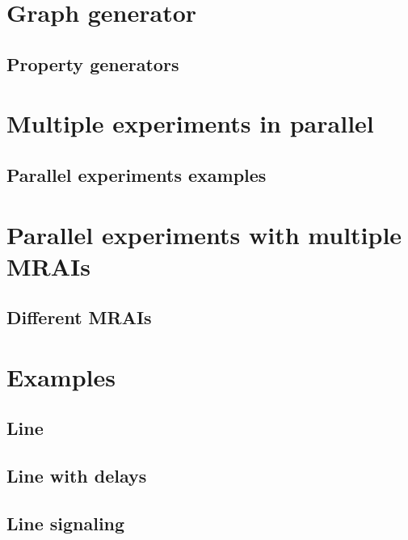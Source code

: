\documentclass[10pt,journal,onecolumn]{IEEEtran}
\begin{document}
\section{Graph generator}
\label{sec:graph_generator}

\subsection{Property generators}
\label{sec:graph_propery_generators}

\section{Multiple experiments in parallel}
\label{sec:multiple_experiments}

\subsection{Parallel experiments examples}
\label{subsec:parallel_examples}

\section{Parallel experiments with multiple MRAIs}
\label{sec:parallel_mrais}

\subsection{Different MRAIs}
\label{subsec:MRAI_types}

\section{Examples}
\label{sec:examples}

\subsection{Line}
\label{subsec:ex_line}

\subsection{Line with delays}
\label{subsec:ex_line_delay}

\subsection{Line signaling}
\label{subsec:ex_line_signaling}
\end{document}
